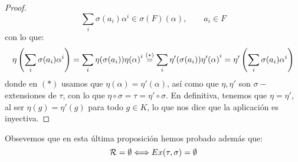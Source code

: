\begin{prop}
\begin{proof}
        \begin{equation*}
            \sum_{i} \sigma(a_i) \alpha^i \in \sigma(F)(\alpha), \qquad a_i \in F
        \end{equation*}
        con lo que:
        \begin{equation*}
            \eta\left(\sum_{i}\sigma(a_i)\alpha^i\right) = \sum_i \eta(\sigma(a_i)) {\eta(\alpha)}^{i} \stackrel{(\ast)}{=} \sum_i \eta'(\sigma(a_i)) {\eta'(\alpha)}^{i} = \eta'\left(\sum_{i}\sigma(a_i)\alpha^i\right) 
        \end{equation*}
        donde en $(\ast)$ usamos que $\eta(\alpha) = \eta'(\alpha)$, así como que $\eta, \eta'$ son $\sigma-$extensiones de $\tau$, con lo que $\eta\circ \sigma = \tau = \eta'\circ \sigma$. En definitiva, tenemos que $\eta = \eta'$, al ser $\eta(g) = \eta'(g)$ para todo $g\in K$, lo que nos dice que la aplicación es inyectiva.
    \end{proof}
\end{prop}

\noindent
Obsevemos que en esta última proposición hemos probado además que:
\begin{equation*}
    \mathcal{R}= \emptyset  \Longleftrightarrow Ex(\tau,\sigma) =  \emptyset 
\end{equation*}

